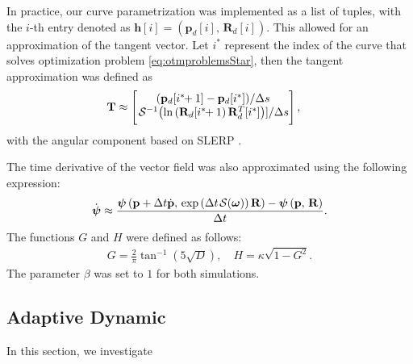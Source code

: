 In practice, our curve parametrization was implemented as a list of tuples, with the $i$-th entry denoted as $\mathbf{h}[i]=(\mathbf{p}_d[i],\, \mathbf{R}_d[i])$. This allowed for an approximation of the tangent vector. Let $i^*$ represent the index of the curve that solves optimization problem \eqref{eq:otmproblemsStar}, then the tangent approximation was defined as
\begin{align}
    \mathbf{T} &\approx \begin{bmatrix}
        (\mathbf{p}_d[i^*\!\!+1] - \mathbf{p}_d[i^*])\slash\Delta s\\\vspace{1mm}
        \invSL[\ln\left(\mathbf{R}_d[i^*\!\!+1]\mathbf{R}_d^T[i^*]\right)]\slash\Delta s
    \end{bmatrix}, \label{eq:tangent-approximation}
\end{align}
with the angular component based on SLERP \citep[p. 104]{hanson2006visualizing}.

The time derivative of the vector field was also approximated using the following expression:
\begin{align}
    \dot{\boldsymbol{\psi}} \approx 
        \frac{\boldsymbol{\psi}\left(\mathbf{p}+\Delta t\dot{\mathbf{p}},\, \exp\left(\Delta t\SL[\boldsymbol{\omega}]\right)\mathbf{R}\right) - \boldsymbol{\psi}\left(\mathbf{p},\, \mathbf{R}\right)}{\Delta t}.
\end{align}
The functions $G$ and $H$ were defined as follows:
\begin{align}
    G = \frac{2}{\pi}\tan^{-1}\left(5\sqrt{D}\right),\quad
    H = \kappa\sqrt{1 - G^2}.
\end{align}
The parameter $\beta$ was set to $1$ for both simulations.

\subsection{Adaptive Dynamic}

In this section, we investigate 

